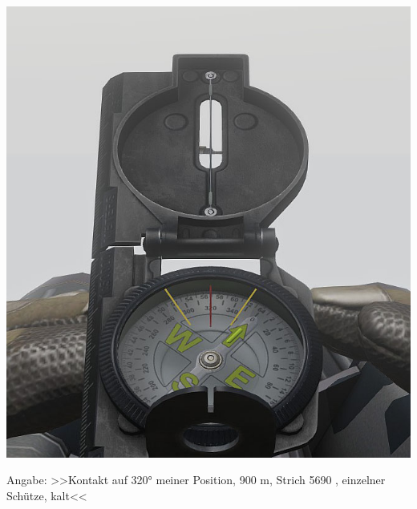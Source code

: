 \begin{minipage}[t]{1\textwidth}
	\includegraphics[width=\textwidth]{./img/fortgeschrittenes/karteUndMarkierungen/Kompass6.jpg}
\end{minipage}
Angabe: >>Kontakt auf 320° meiner Position, 900 m, Strich 5690 , einzelner Schütze, kalt<<